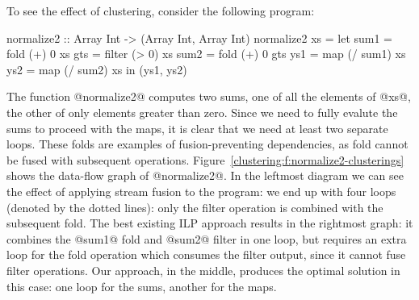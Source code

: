 To see the effect of clustering, consider the following program:
\begin{code}
 normalize2 :: Array Int -> (Array Int, Array Int)
 normalize2 xs
  = let sum1 = fold   (+)  0   xs
        gts  = filter (>   0)  xs
        sum2 = fold   (+)  0   gts
        ys1  = map    (/ sum1) xs
        ys2  = map    (/ sum2) xs
    in (ys1, ys2)
\end{code}

The function @normalize2@ computes two sums, one of all the elements of @xs@, the other of only elements greater than zero. Since we need to fully evalute the sums to proceed with the maps, it is clear that we need at least two separate loops. These folds are examples of fusion-preventing dependencies, as fold cannot be fused with subsequent operations. Figure~\ref{clustering:f:normalize2-clusterings} shows the data-flow graph of @normalize2@. In the leftmost diagram we can see the effect of applying stream fusion to the program: we end up with four loops (denoted by the dotted lines): only the filter operation is combined with the subsequent fold. The best existing ILP approach results in the rightmost graph: it combines the @sum1@ fold and @sum2@ filter in one loop, but requires an extra loop for the fold operation which consumes the filter output, since it cannot fuse filter operations. Our approach, in the middle, produces the optimal solution in this case: one loop for the sums, another for the maps.


